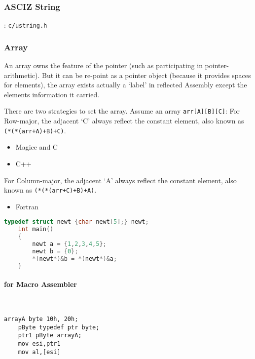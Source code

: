 
\subsubsection{ASCIZ String}

: \verb`c/ustring.h`

\subsubsection{Array}

An array owns the feature of the pointer (such as participating in pointer-arithmetic). But it can be re-point as a pointer object (because it provides spaces for elements), the array exists actually a `label' in reflected Assembly except the elements information it carried. 

There are two strategies to set the array. Assume an array \verb|arr[A][B][C]|:
For Row-major, the adjacent `C' always reflect the constant element, also known as \verb|(*(*(arr+A)+B)+C)|.
\begin{itemize}
	\item Magice and C
	\item C++
\end{itemize}
For Column-major, the adjacent `A' always reflect the constant element, also known as \verb|(*(*(arr+C)+B)+A)|.
\begin{itemize}
	\item Fortran
\end{itemize}

\begin{lstlisting}[language=C]
	typedef struct newt {char newt[5];} newt;
	int main()
	{
		newt a = {1,2,3,4,5};
		newt b = {0};
		*(newt*)&b = *(newt*)&a;
	}
\end{lstlisting}

\paragraph{for Macro Assembler} \

\lstset{style=GlobalASMx86}
\begin{lstlisting}[language={[x86masm]Assembler}]
	arrayA byte 10h, 20h;
	pByte typedef ptr byte;
	ptr1 pByte arrayA;
	mov esi,ptr1
	mov al,[esi]
\end{lstlisting}

